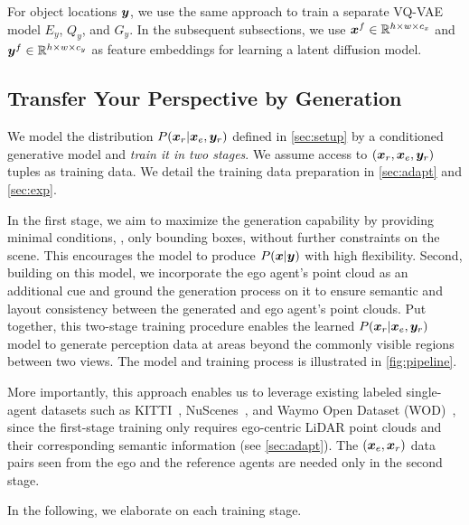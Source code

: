 For object locations ${\bm{y}}$, we use the same approach to train a separate VQ-VAE model $E_y$, $Q_y$, and $G_y$. In the subsequent subsections, we use ${\bm{x}}^f \in {\mathbb{R}}^{h \times w \times c_x}$ and ${\bm{y}}^f \in {\mathbb{R}}^{h \times w \times c_y}$ as feature embeddings for learning a latent diffusion model.

\subsection{Transfer Your Perspective by Generation}
\label{sec:typ}

We model the distribution $P({\bm{x}}_r|{\bm{x}}_e, {\bm{y}}_r)$ defined in \cref{sec:setup} by a conditioned generative model and \emph{train it in two stages}. We assume access to $({\bm{x}}_r, {\bm{x}}_e, {\bm{y}}_r)$ tuples as training data. We detail the training data preparation in \cref{sec:adapt} and \cref{sec:exp}.
 
In the first stage, we aim to maximize the generation capability by providing minimal conditions, \ie, only bounding boxes, without further constraints on the scene. This encourages the model to produce $P({\bm{x}}|{\bm{y}})$ with high flexibility. Second, building on this model, we incorporate the ego agent's point cloud as an additional cue and ground the generation process on it to ensure semantic and layout consistency between the generated and ego agent's point clouds. 
Put together, this two-stage training procedure enables the learned $P({\bm{x}}_r|{\bm{x}}_e, {\bm{y}}_r)$ model to generate perception data at areas beyond the commonly visible regions between two views. 
The model and training process is illustrated in \cref{fig:pipeline}.



More importantly, this approach enables us to leverage existing labeled single-agent datasets such as KITTI~\citep{geiger2012kitti}, NuScenes~\cite{caesar2020nuscenes}, and Waymo Open Dataset (WOD)~\citep{sun2020waymo}, since the first-stage training only requires ego-centric LiDAR point clouds and their corresponding semantic information (see \cref{sec:adapt}). The $({\bm{x}}_e, {\bm{x}}_r)$ data pairs seen from the ego and the reference agents are needed only in the second stage.

In the following, we elaborate on each training stage.

